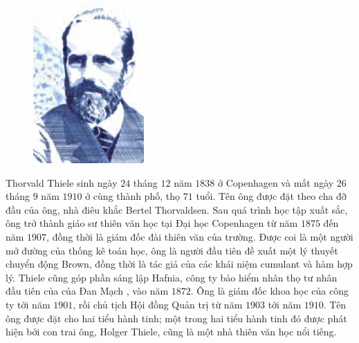 \begin{multicols}{2}
\begin{tBox}
\begin{figure}
			\hspace*{3pt}\includegraphics[width= 1.1\linewidth]{Thiele.png}
			\vspace*{-20pt}
		\end{figure}
		Thorvald Thiele sinh ngày $24$ tháng $12$ năm $1838$ ở Copenhagen và mất ngày $26$ tháng $9$ năm $1910$ ở cùng thành phố, thọ $71$ tuổi. Tên ông được đặt theo cha đỡ đầu của ông, nhà điêu khắc Bertel Thorvaldsen. Sau quá trình học tập xuất sắc, ông trở thành giáo sư thiên văn học tại Đại học Copenhagen từ năm $1875$ đến năm $1907$, đồng thời là giám đốc đài thiên văn của trường. Được coi là một người mở đường của thống kê toán học, ông là người đầu tiên đề xuất một lý thuyết chuyển động Brown, đồng thời là tác giả của các khái niệm cumulant và hàm hợp lý. Thiele cũng góp phần sáng lập Hafnia, công ty bảo hiểm nhân thọ tư nhân đầu tiên của của Đan Mạch , vào năm $1872$. Ông là giám đốc khoa học của công ty tới năm $1901$, rồi chủ tịch Hội đồng Quản trị từ năm $1903$ tới năm $1910$. Tên ông được đặt cho hai tiểu hành tinh; một trong  hai tiểu hành tinh đó được phát hiện bởi con trai ông, Holger Thiele, cũng là một nhà thiên văn học nổi tiếng.

\end{tBox}
\end{multicols}
